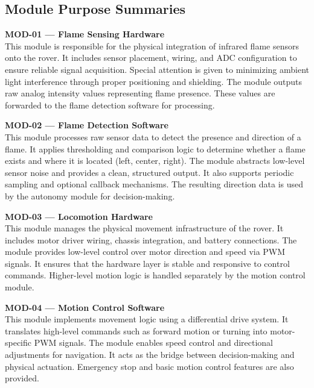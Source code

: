 \documentclass[12pt]{article}
\begin{document}
\subsection{Module Purpose Summaries}

\textbf{MOD-01 — Flame Sensing Hardware} \\
This module is responsible for the physical integration of infrared flame sensors onto the rover. It includes sensor placement, wiring, and ADC configuration to ensure reliable signal acquisition. Special attention is given to minimizing ambient light interference through proper positioning and shielding. The module outputs raw analog intensity values representing flame presence. These values are forwarded to the flame detection software for processing.

\vspace{0.3cm}

\textbf{MOD-02 — Flame Detection Software} \\
This module processes raw sensor data to detect the presence and direction of a flame. It applies thresholding and comparison logic to determine whether a flame exists and where it is located (left, center, right). The module abstracts low-level sensor noise and provides a clean, structured output. It also supports periodic sampling and optional callback mechanisms. The resulting direction data is used by the autonomy module for decision-making.

\vspace{0.3cm}

\textbf{MOD-03 — Locomotion Hardware} \\
This module manages the physical movement infrastructure of the rover. It includes motor driver wiring, chassis integration, and battery connections. The module provides low-level control over motor direction and speed via PWM signals. It ensures that the hardware layer is stable and responsive to control commands. Higher-level motion logic is handled separately by the motion control module.

\vspace{0.3cm}

\textbf{MOD-04 — Motion Control Software} \\
This module implements movement logic using a differential drive system. It translates high-level commands such as forward motion or turning into motor-specific PWM signals. The module enables speed control and directional adjustments for navigation. It acts as the bridge between decision-making and physical actuation. Emergency stop and basic motion control features are also provided.
\end{document}

